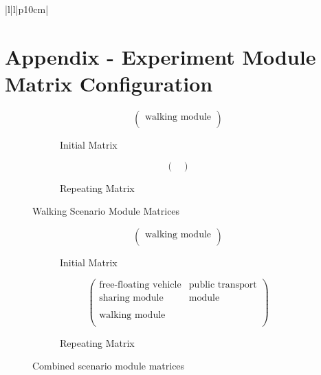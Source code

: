 \begin{table}[ht]
\begin{tabular}{|l|l|p{10cm}|}
\end{tabular}
\normalsize
\end{table}

\clearpage
\section{Appendix - Experiment Module Matrix Configuration}
\label{app:experiment_module_matrix_configuration}


\begin{figure}[ht]
    \centering
    \begin{subfigure}{0.45\linewidth}
        \centering
        \[
        \begin{pmatrix}
            \text{walking module} \\
        \end{pmatrix}
        \]
        \caption{Initial Matrix}
    \end{subfigure}
    \hfill
    \begin{subfigure}{0.45\linewidth}
        \centering
        \[
        \begin{pmatrix}
            \\
        \end{pmatrix}
        \]
        \caption{Repeating Matrix}
    \end{subfigure}
    \caption{Walking Scenario Module Matrices}
    \label{fig:walking_scenario_module_matrix}
\end{figure}


\begin{figure}[ht]
    \centering
    \begin{subfigure}{0.45\linewidth}
        \centering
        \[
        \begin{pmatrix}
            \text{walking module} \\
        \end{pmatrix}
        \]
        \caption{Initial Matrix}
    \end{subfigure}
    \hfill
    \begin{subfigure}{0.45\linewidth}
        \centering
        \[
        \begin{pmatrix}
            \text{free-floating vehicle} & \text{public transport} \\
            \text{sharing module} & \text{module} \\
            \\
            \text{walking module} & \\
        \end{pmatrix}
        \]
        \caption{Repeating Matrix}
    \end{subfigure}
    \caption{Combined scenario module matrices}
    \label{fig:combined_scenario_module_matrix}
\end{figure}

